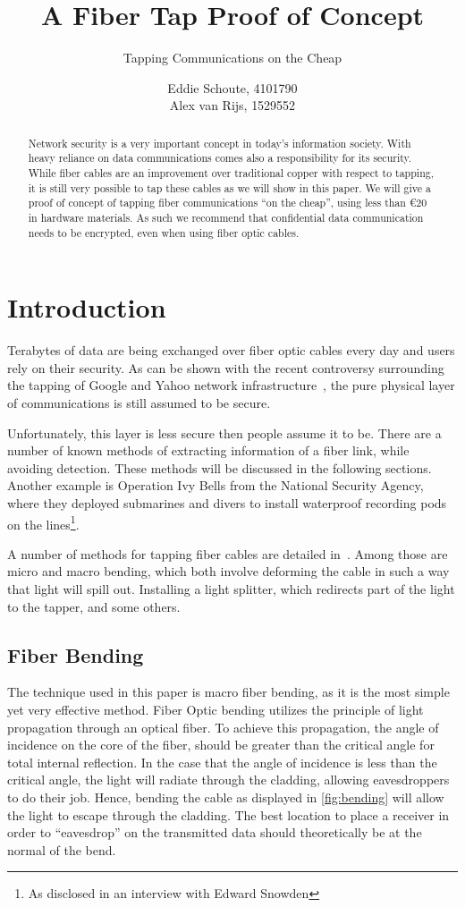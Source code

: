 \documentclass[11pt,twoside,a4paper]{scrartcl}
\title{A Fiber Tap Proof of Concept}
\subtitle{Tapping Communications on the Cheap}
\author{%
		Eddie Schoute, 4101790\\
		Alex van Rijs, 1529552
	}
\begin{document}
\maketitle

\begin{abstract}
	\noindent Network security is a very important concept in today's information society.
	With heavy reliance on data communications comes also a responsibility for its security.
	While fiber cables are an improvement over traditional copper with respect to tapping,
	it is still very possible to tap these cables as we will show in this paper.
	We will give a proof of concept of tapping fiber communications ``on the cheap'',
	using less than \euro{}$20$ in hardware materials.
	As such we recommend that confidential data communication needs to be encrypted,
	even when using fiber optic cables.
\end{abstract}

\section{Introduction}
	Terabytes of data are being exchanged over fiber optic cables every day and users rely on their security.
	As can be shown with the recent controversy surrounding the tapping of Google and Yahoo network infrastructure~\cite{googleyahootap},
	the pure physical layer of communications is still assumed to be secure.

	Unfortunately, this layer is less secure then people assume it to be.
	There are a number of known methods of extracting information of a fiber link, while avoiding detection.
	These methods will be discussed in the following sections.
	Another example is Operation Ivy Bells from the National Security Agency,
	where they deployed submarines and divers to install waterproof recording pods on the lines\footnote{As disclosed in an interview with Edward Snowden}.

	A number of methods for tapping fiber cables are detailed in~\cite{fibertap}.
	Among those are micro and macro bending,
	which both involve deforming the cable in such a way that light will spill out.
	Installing a light splitter, which redirects part of the light to the tapper, and some others.

	\subsection{Fiber Bending}
		The technique used in this paper is macro fiber bending,
		as it is the most simple yet very effective method.
		Fiber Optic bending utilizes the principle of light propagation through an optical fiber.
		To achieve this propagation, the angle of incidence on the core of the fiber,
		should be greater than the critical angle for total internal reflection.
		In the case that the angle of incidence is less than the critical angle, the light will radiate through the cladding,
		allowing eavesdroppers to do their job.
		Hence, bending the cable as displayed in \cref{fig:bending} will allow the light to escape through the cladding.
		The best location to place a receiver in order to ``eavesdrop'' on the transmitted data should theoretically be at the normal of the bend. 
\end{document}
